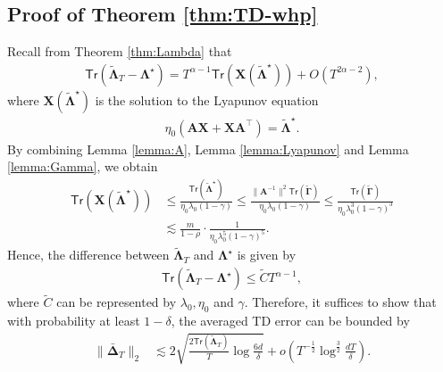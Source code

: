 \subsection{Proof of Theorem \ref{thm:TD-whp}}\label{app:proof-markov-deltat-convergence}
Recall from Theorem \ref{thm:Lambda} that
\begin{align*}
\mathsf{Tr}(\tilde{\bm{\Lambda}}_T - \bm{\Lambda}^\star) = T^{\alpha-1}\mathsf{Tr}(\bm{X}(\tilde{\bm{\Lambda}}^\star)) + O(T^{2\alpha-2}),
\end{align*}
where $\bm{X}(\tilde{\bm{\Lambda}}^\star)$ is the solution to the Lyapunov equation
\begin{align*}
\eta_0(\bm{AX+XA}^\top) = \tilde{\bm{\Lambda}}^\star.
\end{align*}
By combining Lemma \ref{lemma:A}, Lemma \ref{lemma:Lyapunov} and Lemma \ref{lemma:Gamma}, we obtain
\begin{align*}
\mathsf{Tr}(\bm{X}(\tilde{\bm{\Lambda}}^\star)) &\leq \frac{\mathsf{Tr}(\tilde{\bm{\Lambda}}^\star)}{\eta_0\lambda_0(1-\gamma)} \leq \frac{\|\bm{A}^{-1}\|^2 \mathsf{Tr}(\tilde{\bm{\Gamma}})}{\eta_0\lambda_0(1-\gamma)} 
\leq \frac{\mathsf{Tr}(\tilde{\bm{\Gamma}})}{\eta_0\lambda_0^3(1-\gamma)^3} \\ 
&\lesssim \frac{m}{1-\rho} \cdot \frac{1}{\eta_0\lambda_0^5(1-\gamma)^5}.
\end{align*}
Hence, the difference between $\tilde{\bm{\Lambda}}_T$ and $\bm{\Lambda}^\star$ is given by
\begin{align*}
\mathsf{Tr}(\tilde{\bm{\Lambda}}_T - \bm{\Lambda}^\star)  \leq \widetilde{C}T^{\alpha-1},
\end{align*}
where $\widetilde{C}$ can be represented by $\lambda_0,\eta_0$ and $\gamma$.
Therefore, it suffices to show that with probability at least $1-\delta$, the averaged TD error can be bounded by
\begin{align*}
\|\bar{\bm{\Delta}}_T\|_2 &\lesssim 2\sqrt{\frac{2\mathsf{Tr}(\widetilde{\bm{\Lambda}}_T)}{T} \log \frac{6d}{\delta}} + o\left(T^{-\frac{1}{2}}\log^{\frac{3}{2}}\frac{dT}{\delta}\right).
\end{align*}

